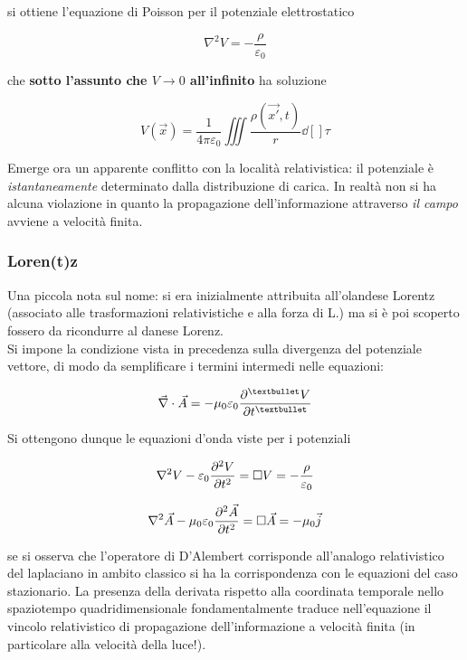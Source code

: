 si ottiene l'equazione di Poisson per il potenziale elettrostatico

\[\nabla^2 V = - \frac{\rho}{\varepsilon_0}\]

che \textbf{sotto l'assunto che $V \rightarrow 0$ all'infinito} ha soluzione

\[V(\vec{x}) = \frac{1}{4 \pi \varepsilon_0} \iiint\limits \frac{\rho(\vec{x'}, t)}{r} \dd[]{\tau}\]

Emerge ora un apparente conflitto con la località relativistica: il potenziale è \textit{istantaneamente} determinato dalla distribuzione di carica. In realtà non si ha alcuna violazione in quanto la propagazione dell'informazione attraverso \textit{il campo} avviene a velocità finita.

\subsubsection*{Loren(t)z}

Una piccola nota sul nome: si era inizialmente attribuita all'olandese Lorentz (associato alle trasformazioni relativistiche e alla forza di L.) ma si è poi scoperto fossero da ricondurre al danese Lorenz.
\\Si impone la condizione vista in precedenza sulla divergenza del potenziale vettore, di modo da semplificare i termini intermedi nelle equazioni:

\[\vec{\nabla} \cdot \vec{A} = - \mu_0 \varepsilon_0 \pdv[•]{V}{t}\]

Si ottengono dunque le equazioni d'onda viste per i potenziali

\[\nabla^2 V - \varepsilon_0 \pdv[2]{V}{t} = \Box V = - \frac{\rho}{\varepsilon_0}\]

\[\nabla^2 \vec{A} - \mu_0 \varepsilon_0 \pdv[2]{\vec{A}}{t} = \Box \vec{A} = - \mu_0 \vec{j}\]

se si osserva che l'operatore di D'Alembert corrisponde all'analogo relativistico del laplaciano in ambito classico si ha la corrispondenza con le equazioni del caso stazionario. La presenza della derivata rispetto alla coordinata temporale nello spaziotempo quadridimensionale fondamentalmente traduce nell'equazione il vincolo relativistico di propagazione dell'informazione a velocità finita (in particolare alla velocità della luce!).





